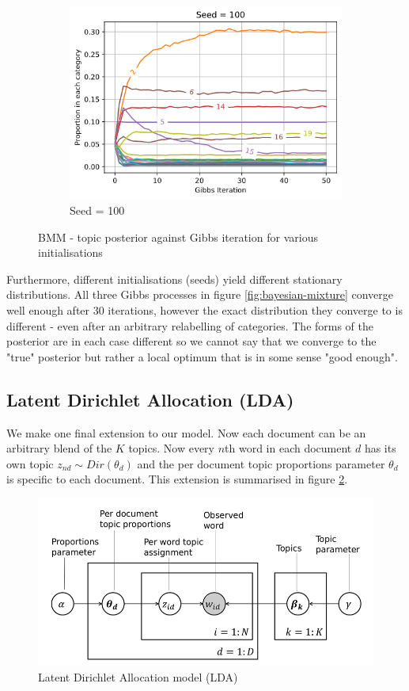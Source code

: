 \documentclass[]{article}
\begin{document}
\begin{figure}[!h]
\begin{subfigure}{0.33\linewidth}
		\includegraphics[width=\linewidth]{gibbs-posterior-3.png}
		\caption{Seed = 100}	
	\end{subfigure}
	\caption{BMM - topic posterior against Gibbs iteration for various initialisations}
	\label{fig:gibbs-posterior}
\end{figure}

Furthermore, different initialisations (seeds) yield different stationary distributions. All three Gibbs processes in figure \ref{fig:bayesian-mixture} converge well enough after 30 iterations, however the exact distribution they converge to is different - even after an arbitrary relabelling of categories. The forms of the posterior are in each case different so we cannot say that we converge to the "true" posterior but rather a local optimum that is in some sense "good enough".

\clearpage
\subsection{Latent Dirichlet Allocation (LDA)}

We make one final extension to our model. Now each document can be an arbitrary blend of the $K$ topics. Now every $n$th word in each document $d$ has its own topic $z_{nd} \sim Dir(\theta_d)$ and the per document topic proportions parameter $\theta_d$ is specific to each document. This extension is summarised in figure \ref{fig:lda-model}.
%
\begin{figure}[!h]
	\centering
	\includegraphics[width=0.6\linewidth]{lda.png}
	\caption{Latent Dirichlet Allocation model (LDA)}
	\label{fig:lda-model}
\end{figure}
\end{document}
